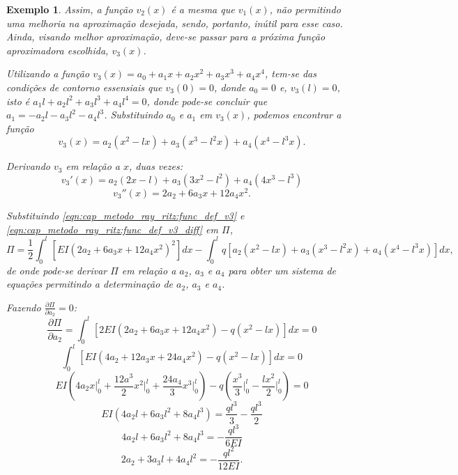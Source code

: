 \documentclass[
	12pt,				%
	openright,			%
    twoside,			%
	a4paper,			%
	english,			%
	french,				%
	spanish,			%
	brazil				%
	]{abntex2}
\newtheorem{exemplo}{Exemplo}
\numberwithin{lema}{chapter}
\numberwithin{teorema}{chapter}
\numberwithin{definicao}{chapter}
\numberwithin{exemplo}{chapter}
\numberwithin{figure}{chapter}
\begin{document}
\begin{exemplo}
	Assim, a função $v_2(x)$ é a mesma que $v_1(x)$, não permitindo uma melhoria na aproximação desejada, sendo, portanto, inútil para esse caso. Ainda, visando melhor aproximação, deve-se passar para a próxima função aproximadora escolhida, $v_3(x)$.
	
	Utilizando a função $v_3(x)=a_0+a_1x+a_2x^2+a_3x^3+a_4x^4$, tem-se das condições de contorno essensiais que $v_3(0)=0$, donde $a_0=0$ e, $v_3(l)=0$, isto é $a_1l+a_2l^2+a_3l^3+a_4l^4=0$, donde pode-se concluir que $a_1=-a_2l-a_3l^2-a_4l^3$. Substituindo $a_0$ e $a_1$ em $v_3(x)$, podemos encontrar a função
	\begin{equation}
		\label{eqn:cap_metodo_ray_ritz:func_def_v3}
		v_3(x)=
		a_2 (x^2 - lx)
		+
		a_3 (x^3 - l^2x)
		+
		a_4 (x^4 - l^3x)
		\text{.}
	\end{equation}
	
	Derivando $v_3$ em relação a $x$, duas vezes:
	$$
		v_3'(x)=
		a_2(2x - l)
		+
		a_3(3x^2 - l^2)
		+
		a_4(4x^3 - l^3)
	$$
	\begin{equation}
		\label{eqn:cap_metodo_ray_ritz:func_def_v3_diff}
		v_3''(x)=
		2a_2
		+
		6a_3 x
		+
		12a_4 x^2
		\text{.}
	\end{equation}
	
	Substituindo \eqref{eqn:cap_metodo_ray_ritz:func_def_v3} e \eqref{eqn:cap_metodo_ray_ritz:func_def_v3_diff} em $\Pi$,
	$$
		\Pi = \frac{1}{2} \int_0^l \left [
			EI(2a_2+6a_3x+12a_4x^2)^2
		\right ] dx
		-
		\int_0^l q \left [
			a_2(x^2 - lx)
			+
			a_3(x^3 - l^2x)
			+
			a_4(x^4 - l^3x)
		\right ] dx
		\text{,}
	$$
	de onde pode-se derivar $\Pi$ em relação a $a_2$, $a_3$ e $a_4$ para obter um sistema de equações permitindo a determinação de $a_2$, $a_3$ e $a_4$.
	
	Fazendo $\frac{\partial \Pi}{\partial a_2} = 0$:
	\begin{equation}
		\label{eqn:cap_metodo_ray_ritz:exemp_v3_diff_a2}
		\frac{\partial \Pi}{\partial a_2}
		=
		\int_0^l \left [
			2EI(2a_2 + 6a_3x + 12a_4x^2)
			-
			q(x^2 - lx)
		\right ] dx
		= 0
	\end{equation}
	$$
		\int_0^l \left [
			EI(4a_2 + 12a_3x + 24a_4x^2)
			-
			q(x^2 - lx)
		\right ] dx
		= 0
	$$
	$$
		EI \left (
			4a_2 x \Big |_0^l
			+
			\frac{12a^3}{2}x^2 \Big |_0^l
			+
			\frac{24a_4}{3}x^3 \Big |_0^l
		\right )
		- q
		\left (
			\frac{x^3}{3} \Big |_0^l
			-
			\frac{lx^2}{2} \Big |_0^l
		\right )
		= 0
	$$
	$$
		EI(4a_2l + 6a_3l^2 + 8a_4l^3)
		=
		\frac{ql^3}{3}
		-
		\frac{ql^3}{2}
	$$
	$$
		4a_2l + 6a_3l^2 + 8a_4l^3 = -\frac{ql^3}{6EI}
	$$
	\begin{equation}
		\label{eq:exemp_rayritz_approx3_eq1}
		2a_2 + 3a_3l + 4a_4l^2 = -\frac{ql^2}{12EI}
		\text{.}
	\end{equation}
		

\end{exemplo}
\end{document}
